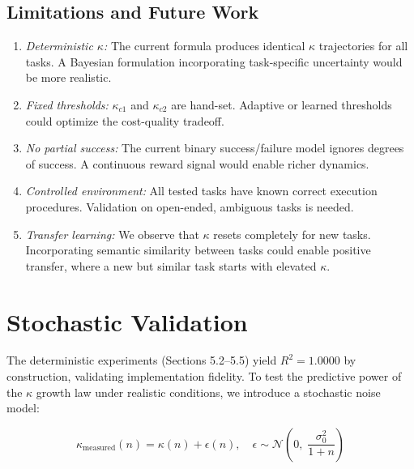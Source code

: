 \documentclass[10pt,twocolumn]{article}
\newcommand{\kap}{\kappa}
\begin{document}
\subsection{Limitations and Future Work}

\begin{enumerate}[leftmargin=*, itemsep=2pt]
  \item \textit{Deterministic $\kap$:} The current formula 
    produces identical $\kap$ trajectories for all tasks. 
    A Bayesian formulation incorporating task-specific 
    uncertainty would be more realistic.
    
  \item \textit{Fixed thresholds:} $\kap_{c1}$ and 
    $\kap_{c2}$ are hand-set. Adaptive or learned thresholds 
    could optimize the cost-quality tradeoff.
    
  \item \textit{No partial success:} The current binary 
    success/failure model ignores degrees of success. A 
    continuous reward signal would enable richer dynamics.
    
  \item \textit{Controlled environment:} All tested tasks 
    have known correct execution procedures. Validation on 
    open-ended, ambiguous tasks is needed.
    
  \item \textit{Transfer learning:} We observe that $\kap$ 
    resets completely for new tasks. Incorporating semantic 
    similarity between tasks could enable positive transfer, 
    where a new but similar task starts with elevated $\kap$.
\end{enumerate}

\section{Stochastic Validation}
\label{sec:stochastic} 
 
 The deterministic experiments (Sections 5.2--5.5) yield 
 $R^2 = 1.0000$ by construction, validating implementation 
 fidelity. To test the predictive power of the $\kappa$ 
 growth law under realistic conditions, we introduce a 
 stochastic noise model: 
 
 \begin{equation} 
   \kappa_{\text{measured}}(n) = \kappa(n) + \epsilon(n), \quad 
   \epsilon \sim \mathcal{N}\!\left(0,\;\frac{\sigma_0^2}{1+n}\right) 
   \label{eq:noise} 
 \end{equation} 
 
\end{document}
